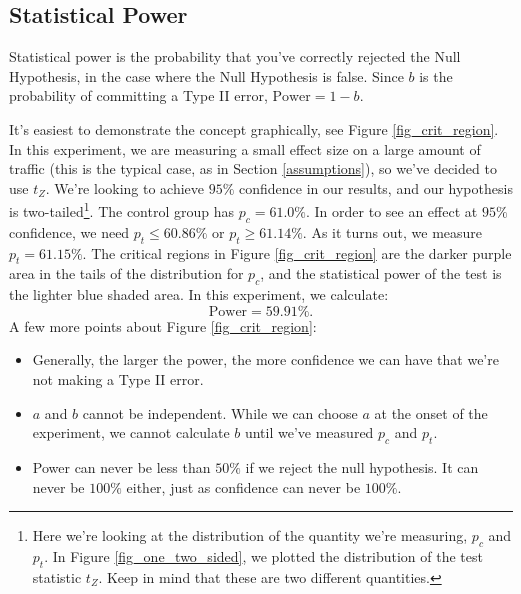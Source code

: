 \documentclass{article}
\numberwithin{equation}{section}
\begin{document}
\subsection{Statistical Power}

Statistical power is the probability that you've correctly rejected the Null Hypothesis, in the case where the Null Hypothesis is false. Since $b$ is the probability of committing a Type II error, $\mathrm{Power} = 1 - b$. 

It's easiest to demonstrate the concept graphically, see Figure \ref{fig_crit_region}. In this experiment, we are measuring a small effect size on a large amount of traffic (this is the typical case, as in Section \ref{assumptions}), so we've decided to use $t_Z$. We're looking to achieve $95\%$ confidence in our results, and our hypothesis is two-tailed\footnote{Here we're looking at the distribution of the quantity we're measuring, $p_c$ and $p_t$. In Figure \ref{fig_one_two_sided}, we plotted the distribution of the test statistic $t_Z$. Keep in mind that these are two different quantities.}. The control group has $p_c = 61.0\%$. In order to see an effect at $95\%$ confidence, we need $p_t \leq 60.86\%$ or $p_t \geq 61.14\%$. As it turns out, we measure $p_t = 61.15\%$. The critical regions in Figure \ref{fig_crit_region} are the darker purple area in the tails of the distribution for $p_c$, and the statistical power of the test is the lighter blue shaded area. In this experiment, we calculate:
\begin{equation}
	\mathrm{Power} = 59.91\%.
\end{equation}
A few more points about Figure \ref{fig_crit_region}:
\begin{itemize}
	\item Generally, the larger the power, the more confidence we can have that we're not making a Type II error.
	\item $a$ and $b$ cannot be independent. While we can choose $a$ at the onset of the experiment, we cannot calculate $b$ until we've measured $p_c$ and $p_t$.
	\item Power can never be less than $50\%$ if we reject the null hypothesis. It can never be $100\%$ either, just as confidence can never be $100\%$.
\end{itemize}
\end{document}

